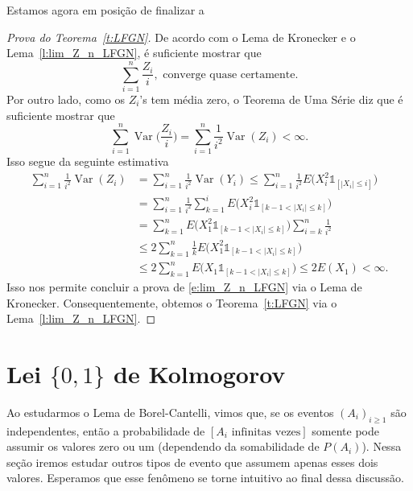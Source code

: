 \documentclass[reqno]{article}
\newcommand*\1{\mathds{1}}
\DeclareMathOperator{\Var}{Var}
\begin{document}
Estamos agora em posição de finalizar a
\begin{proof}[Prova do Teorema~\ref{t:LFGN}]
  De acordo com o Lema de Kronecker e o Lema~\ref{l:lim_Z_n_LFGN}, é suficiente mostrar que
  \begin{equation}
    \sum_{i=1}^n \frac{Z_i}{i}, \text{ converge quase certamente}.
  \end{equation}
  Por outro lado, como os $Z_i$'s tem média zero, o Teorema de Uma Série diz que é suficiente mostrar que
  \begin{equation}
    \sum_{i=1}^n \Var\Big(\frac{Z_i}{i}\Big) = \sum_{i=1}^n \frac{1}{i^2} \Var(Z_i) < \infty.
  \end{equation}
  Isso segue da seguinte estimativa
  \begin{equation}
    \begin{split}
      \sum_{i=1}^n \frac{1}{i^2} \Var(Z_i) & = \sum_{i=1}^n \frac{1}{i^2} \Var(Y_i) \leq \sum_{i=1}^n \frac{1}{i^2} E\big( X_i^2 \1_{[|X_i| \leq i]}\big)\\
      & = \sum_{i=1}^n \frac{1}{i^2} \sum_{k=1}^{i} E\big( X_i^2 \1_{[k-1 < |X_i| \leq k]}\big)\\
      & = \sum_{k=1}^n E\big( X_1^2 \1_{[k-1 < |X_i| \leq k]}\big) \sum_{i=k}^{n} \frac{1}{i^2}\\
      & \leq 2 \sum_{k=1}^n \frac{1}{k} E\big( X_1^2 \1_{[k-1 < |X_i| \leq k]}\big)\\
      & \leq 2 \sum_{k=1}^n E\big( X_1 \1_{[k-1 < |X_i| \leq k]}\big) \leq 2E(X_1) < \infty.
    \end{split}
  \end{equation}
  Isso nos permite concluir a prova de \eqref{e:lim_Z_n_LFGN} via o Lema de Kronecker.
  Consequentemente, obtemos o Teorema~\ref{t:LFGN} via o Lema~\ref{l:lim_Z_n_LFGN}.
\end{proof}

\newpage

\section{Lei $\{0, 1\}$ de Kolmogorov}

Ao estudarmos o Lema de Borel-Cantelli, vimos que, se os eventos $(A_i)_{i \geq 1}$ são independentes, então a probabilidade de $[A_i \text{ infinitas vezes}]$ somente pode assumir os valores zero ou um (dependendo da somabilidade de $P(A_i)$).
Nessa seção iremos estudar outros tipos de evento que assumem apenas esses dois valores.
Esperamos que esse fenômeno se torne intuitivo ao final dessa discussão.
\end{document}

